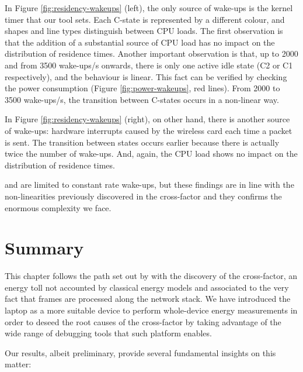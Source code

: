 \documentclass[twoside,nohyper]{tufte-book}
\begin{document}
In Figure \ref{fig:residency-wakeups} (left), the only source of wake-ups is the kernel timer that our tool sets. Each C-state is represented by a different colour, and shapes and line types distinguish between CPU loads. The first observation is that the addition of a substantial source of CPU load has no impact on the distribution of residence times. Another important observation is that, up to 2000 and from 3500 wake-ups/s onwards, there is only one active idle state (C2 or C1 respectively), and the behaviour is linear. This fact can be verified by checking the power consumption (Figure \ref{fig:power-wakeups}, red lines). From 2000 to 3500 wake-ups/s, the transition between C-states occurs in a non-linear way.

In Figure \ref{fig:residency-wakeups} (right), on other hand, there is another source of wake-ups: hardware interrupts caused by the wireless card each time a packet is sent. The transition between states occurs earlier because there is actually twice the number of wake-ups. And, again, the CPU load shows no impact on the distribution of residence times.

 and are limited to constant rate wake-ups, but these findings are in line with the non-linearities previously discovered in the cross-factor and they confirms the enormous complexity we face.

\hypertarget{summary-1}{%
\section{Summary}\label{summary-1}}

This chapter follows the path set out by \citet{Serrano2014} with the discovery of the cross-factor, an energy toll not accounted by classical energy models and associated to the very fact that frames are processed along the network stack. We have introduced the laptop as a more suitable device to perform whole-device energy measurements in order to deseed the root causes of the cross-factor by taking advantage of the wide range of debugging tools that such platform enables.

Our results\cite[0pt]{contrib-04a,contrib-04b}, albeit preliminary, provide several fundamental insights on this matter:
\end{document}
